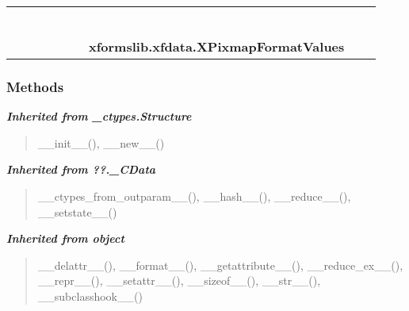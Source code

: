     \label{xformslib:xfdata:XPixmapFormatValues}
\begin{tabular}{cccccccccc}
\multicolumn{2}{r}{\settowidth{\BCL}{object}\multirow{2}{\BCL}{object}}
&&
&&
&&
  \\\cline{3-3}
  &&\multicolumn{1}{c|}{}
&&
&&
&&
  \\
\multicolumn{4}{r}{\settowidth{\BCL}{??.\_CData}\multirow{2}{\BCL}{??.\_CData}}
&&
&&
  \\\cline{5-5}
  &&&&\multicolumn{1}{c|}{}
&&
&&
  \\
\multicolumn{6}{r}{\settowidth{\BCL}{\_ctypes.Structure}\multirow{2}{\BCL}{\_ctypes.Structure}}
&&
  \\\cline{7-7}
  &&&&&&\multicolumn{1}{c|}{}
&&
  \\
&&&&&&\multicolumn{2}{l}{\textbf{xformslib.xfdata.XPixmapFormatValues}}
\end{tabular}



  \subsubsection{Methods}


\large{\textbf{\textit{Inherited from \_ctypes.Structure}}}

\begin{quote}
\_\_init\_\_(), \_\_new\_\_()
\end{quote}

\large{\textbf{\textit{Inherited from ??.\_CData}}}

\begin{quote}
\_\_ctypes\_from\_outparam\_\_(), \_\_hash\_\_(), \_\_reduce\_\_(), \_\_setstate\_\_()
\end{quote}

\large{\textbf{\textit{Inherited from object}}}

\begin{quote}
\_\_delattr\_\_(), \_\_format\_\_(), \_\_getattribute\_\_(), \_\_reduce\_ex\_\_(), \_\_repr\_\_(), \_\_setattr\_\_(), \_\_sizeof\_\_(), \_\_str\_\_(), \_\_subclasshook\_\_()
\end{quote}

